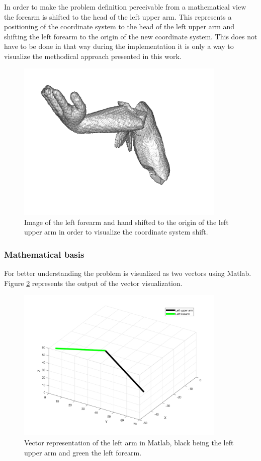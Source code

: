 In order to make the problem definition perceivable from a mathematical view the forearm is shifted to the head of the left upper arm. This represents a positioning of the coordinate system to the head of the left upper arm and shifting the left forearm to the origin of the new coordinate system. This does not have to be done in that way during the implementation it is only a way to visualize the methodical approach presented in this work.

\begin{figure} [!htb]
    \centering
	\includegraphics[width=10cm]{content/images/coordinateSystemShift}
	\caption{Image of the left forearm and hand shifted to the origin of the left upper arm in order to visualize the coordinate system shift.} 
	\label{fig:coordinateSystemShift}
\end{figure}

\newpage
\subsubsection{Mathematical basis}

For better understanding the problem is visualized as two vectors using Matlab. Figure \ref{fig:matlab} represents the output of the vector visualization. 

\begin{figure} [!htb]
    \centering
	\includegraphics[width=10cm]{content/images/matlab.png}
	\caption{Vector representation of the left arm in Matlab, black being the left upper arm and green the left forearm.} 
	\label{fig:matlab}
\end{figure}

